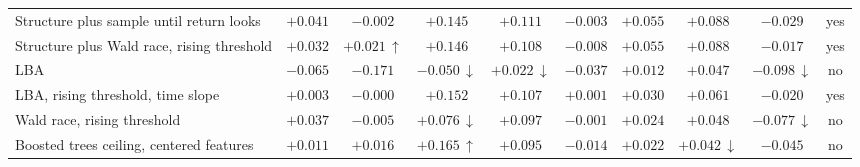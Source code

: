 \begin{table}[t]
\begin{tabular}{>{\raggedright\arraybackslash}p{3.4cm}ccccccccc}
Structure plus sample until return looks & $+0.041$ & $-0.002$ & $+0.145$ & $+0.111$ & $-0.003$ & $+0.055$ & $+0.088$ & $-0.029$ & yes \\
Structure plus Wald race, rising threshold & $+0.032$ & $+0.021$\,$\uparrow$ & $+0.146$ & $+0.108$ & $-0.008$ & $+0.055$ & $+0.088$ & $-0.017$ & yes \\
LBA & $-0.065$ & $-0.171$ & $-0.050$\,$\downarrow$ & $+0.022$\,$\downarrow$ & $-0.037$ & $+0.012$ & $+0.047$ & $-0.098$\,$\downarrow$ & no \\
LBA, rising threshold, time slope & $+0.003$ & $-0.000$ & $+0.152$ & $+0.107$ & $+0.001$ & $+0.030$ & $+0.061$ & $-0.020$ & yes \\
Wald race, rising threshold & $+0.037$ & $-0.005$ & $+0.076$\,$\downarrow$ & $+0.097$ & $-0.001$ & $+0.024$ & $+0.048$ & $-0.077$\,$\downarrow$ & no \\
Boosted trees ceiling, centered features & $+0.011$ & $+0.016$ & $+0.165$\,$\uparrow$ & $+0.095$ & $-0.014$ & $+0.022$ & $+0.042$\,$\downarrow$ & $-0.045$ & no \\
\bottomrule
\end{tabular}
\end{table}

